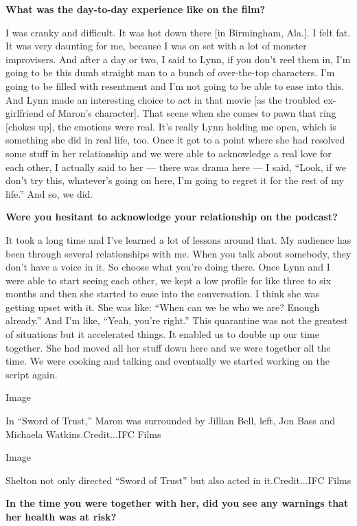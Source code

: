\textbf{What was the day-to-day experience like on the film?}

I was cranky and difficult. It was hot down there {[}in Birmingham,
Ala.{]}. I felt fat. It was very daunting for me, because I was on set
with a lot of monster improvisers. And after a day or two, I said to
Lynn, if you don't reel them in, I'm going to be this dumb straight man
to a bunch of over-the-top characters. I'm going to be filled with
resentment and I'm not going to be able to ease into this. And Lynn made
an interesting choice to act in that movie {[}as the troubled
ex-girlfriend of Maron's character{]}. That scene when she comes to pawn
that ring {[}chokes up{]}, the emotions were real. It's really Lynn
holding me open, which is something she did in real life, too. Once it
got to a point where she had resolved some stuff in her relationship and
we were able to acknowledge a real love for each other, I actually said
to her --- there was drama here --- I said, ``Look, if we don't try
this, whatever's going on here, I'm going to regret it for the rest of
my life.'' And so, we did.

\textbf{Were you hesitant to acknowledge your relationship on the
podcast?}

It took a long time and I've learned a lot of lessons around that. My
audience has been through several relationships with me. When you talk
about somebody, they don't have a voice in it. So choose what you're
doing there. Once Lynn and I were able to start seeing each other, we
kept a low profile for like three to six months and then she started to
ease into the conversation. I think she was getting upset with it. She
was like: ``When can we be who we are? Enough already.'' And I'm like,
``Yeah, you're right.'' This quarantine was not the greatest of
situations but it accelerated things. It enabled us to double up our
time together. She had moved all her stuff down here and we were
together all the time. We were cooking and talking and eventually we
started working on the script again.

Image

In ``Sword of Trust,'' Maron was surrounded by Jillian Bell, left, Jon
Bass and Michaela Watkins.Credit...IFC Films

Image

Shelton not only directed ``Sword of Trust'' but also acted in
it.Credit...IFC Films

\textbf{In the time you were together with her, did you see any warnings
that her health was at risk?}

